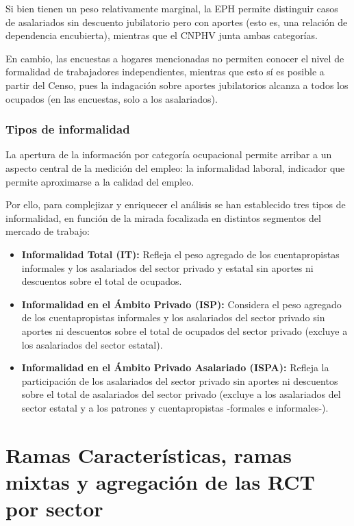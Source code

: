\documentclass[
  openany]{book}
\begin{document}
Si bien tienen un peso relativamente marginal, la EPH permite distinguir casos de asalariados sin descuento jubilatorio pero con aportes (esto es, una relación de dependencia encubierta), mientras que el CNPHV junta ambas categorías.

En cambio, las encuestas a hogares mencionadas no permiten conocer el nivel de formalidad de trabajadores independientes, mientras que esto sí es posible a partir del Censo, pues la indagación sobre aportes jubilatorios alcanza a todos los ocupados (en las encuestas, solo a los asalariados).

\hypertarget{tipos-de-informalidad}{%
\subsubsection{Tipos de informalidad}\label{tipos-de-informalidad}}

La apertura de la información por categoría ocupacional permite arribar a un aspecto central de la medición del empleo: la informalidad laboral, indicador que permite aproximarse a la calidad del empleo.

Por ello, para complejizar y enriquecer el análisis se han establecido tres tipos de informalidad, en función de la mirada focalizada en distintos segmentos del mercado de trabajo:

\begin{itemize}
\item
  \textbf{Informalidad Total (IT):} Refleja el peso agregado de los cuentapropistas informales y los asalariados del sector privado y estatal sin aportes ni descuentos sobre el total de ocupados.
\item
  \textbf{Informalidad en el Ámbito Privado (ISP):} Considera el peso agregado de los cuentapropistas informales y los asalariados del sector privado sin aportes ni descuentos sobre el total de ocupados del sector privado (excluye a los asalariados del sector estatal).
\item
  \textbf{Informalidad en el Ámbito Privado Asalariado (ISPA):} Refleja la participación de los asalariados del sector privado sin aportes ni descuentos sobre el total de asalariados del sector privado (excluye a los asalariados del sector estatal y a los patrones y cuentapropistas -formales e informales-).
\end{itemize}

\hypertarget{ramas-caracteruxedsticas-ramas-mixtas-y-agregaciuxf3n-de-las-rct-por-sector}{%
\section{Ramas Características, ramas mixtas y agregación de las RCT por sector}\label{ramas-caracteruxedsticas-ramas-mixtas-y-agregaciuxf3n-de-las-rct-por-sector}}
\end{document}
